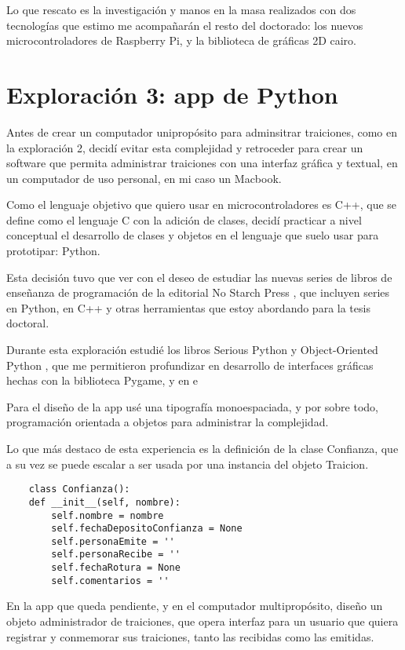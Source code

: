 \documentclass{article}
\begin{document}
Lo que rescato es la investigación y manos en la masa realizados con dos tecnologías que estimo me acompañarán el resto del doctorado: los nuevos microcontroladores de Raspberry Pi, y la biblioteca de gráficas 2D cairo.

\clearpage

\section{Exploración 3: app de Python}

Antes de crear un computador unipropósito para adminsitrar traiciones, como en la exploración 2, decidí evitar esta complejidad y retroceder para crear un software que permita administrar traiciones con una interfaz gráfica y textual, en un computador de uso personal, en mi caso un Macbook.

Como el lenguaje objetivo que quiero usar en microcontroladores es C++, que se define como el lenguaje C con la adición de clases, decidí practicar a nivel conceptual el desarrollo de clases y objetos en el lenguaje que suelo usar para prototipar: Python.

Esta decisión tuvo que ver con el deseo de estudiar las nuevas series de libros de enseñanza de programación de la editorial No Starch Press \cite{noStarchPress}, que incluyen series en Python, en C++ y otras herramientas que estoy abordando para la tesis doctoral.

Durante esta exploración estudié los libros Serious Python \cite{seriousPython} y Object-Oriented Python \cite{objectOrientedPython}, que me permitieron profundizar en desarrollo de interfaces gráficas hechas con la biblioteca Pygame, y en e

Para el diseño de la app usé una tipografía monoespaciada, y por sobre todo, programación orientada a objetos para administrar la complejidad.

Lo que más destaco de esta experiencia es la definición de la clase Confianza, que a su vez se puede escalar a ser usada por una instancia del objeto Traicion.

\begin{lstlisting}
    class Confianza():
    def __init__(self, nombre):
        self.nombre = nombre
        self.fechaDepositoConfianza = None
        self.personaEmite = ''
        self.personaRecibe = ''
        self.fechaRotura = None
        self.comentarios = ''
\end{lstlisting}

En la app que queda pendiente, y en el computador multipropósito, diseño un objeto administrador de traiciones, que opera interfaz para un usuario que quiera registrar y conmemorar sus traiciones, tanto las recibidas como las emitidas.
\end{document}
